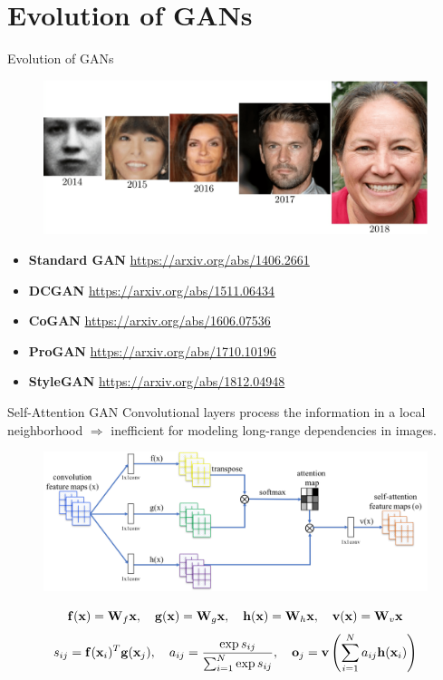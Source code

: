 \section{Evolution of GANs}
\begin{frame}{Evolution of GANs}
	\begin{figure}
		\centering
		\includegraphics[width=\linewidth]{figs/gan_evolution}
	\end{figure}
	\begin{itemize}
		\item \textbf{Standard GAN} \href{https://arxiv.org/abs/1406.2661}{https://arxiv.org/abs/1406.2661}
		\item \textbf{DCGAN} \href{https://arxiv.org/abs/1511.06434}{https://arxiv.org/abs/1511.06434}
		\item \textbf{CoGAN} \href{https://arxiv.org/abs/1606.07536}{https://arxiv.org/abs/1606.07536}
		\item \textbf{ProGAN} \href{https://arxiv.org/abs/1710.10196}{https://arxiv.org/abs/1710.10196} 
		\item \textbf{StyleGAN} \href{https://arxiv.org/abs/1812.04948}{https://arxiv.org/abs/1812.04948}
	\end{itemize}
\end{frame}
\begin{frame}{Self-Attention GAN}
	Convolutional layers process the information in a local neighborhood $\Rightarrow$ inefficient for modeling long-range dependencies in images.
	\vspace{-0.3cm}
	\begin{figure}
		\centering
		\includegraphics[width=0.9\linewidth]{figs/self-attention}
	\end{figure}
	\[
	\mathbf{f}(\mathbf{x}) = \mathbf{W}_f \mathbf{x}, \quad \mathbf{g}(\mathbf{x}) = \mathbf{W}_g\mathbf{x}, \quad \mathbf{h} (\mathbf{x}) = \mathbf{W}_h\mathbf{x}, \quad \mathbf{v}(\mathbf{x}) = \mathbf{W}_v\mathbf{x}
	\]
	\[
	s_{ij} = \mathbf{f}(\mathbf{x}_i)^T \mathbf{g}(\mathbf{x}_j), \quad a_{ij} = \frac{\exp{s_{ij}}}{\sum_{i=1}^N \exp{s_{ij}}}, \quad \textbf{o}_j = \textbf{v}\left( \sum_{i=1}^N a_{ij} \mathbf{h}(\mathbf{x}_i) \right)
	\]
\end{frame}
